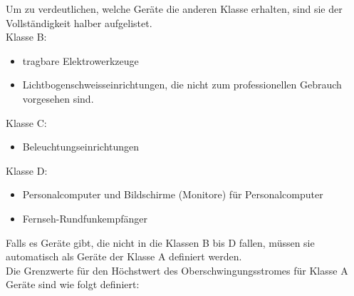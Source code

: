 \begin{appendix}
Um zu verdeutlichen, welche Geräte die anderen Klasse erhalten, sind sie der Vollständigkeit halber aufgelistet.\\
Klasse B:
\begin{itemize}
	\item tragbare Elektrowerkzeuge 	
	\item Lichtbogenschweisseinrichtungen, die nicht zum professionellen Gebrauch vorgesehen sind.
\end{itemize} 
Klasse C:
\begin{itemize}
	\item Beleuchtungseinrichtungen	
\end{itemize} 
Klasse D:
\begin{itemize}
	\item Personalcomputer und Bildschirme (Monitore) für Personalcomputer	
	\item Fernseh-Rundfunkempfänger
\end{itemize}

\newpage
Falls es Geräte gibt, die nicht in die Klassen B bis D fallen, müssen sie automatisch als Geräte der Klasse A definiert werden.\\
Die Grenzwerte für den Höchstwert des Oberschwingungsstromes für Klasse A Geräte sind wie folgt definiert:


\end{appendix}
